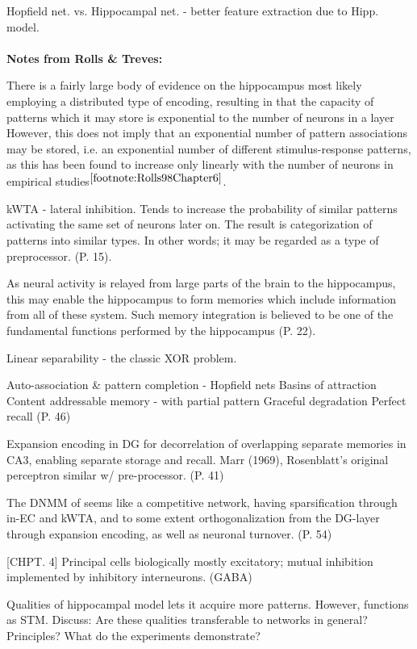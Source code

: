Hopfield net. vs. Hippocampal net. - better feature extraction due to Hipp. model.
\\\\

\textbf{Notes from Rolls \& Treves:}

There is a fairly large body of evidence on the hippocampus most likely employing a distributed type of encoding, resulting in that the capacity of patterns which it may store is exponential to the number of neurons in a layer
However, this does not imply that an exponential number of pattern associations may be stored, i.e. an exponential number of different stimulus-response patterns, as this has been found to increase only linearly with the number of neurons in empirical studies$^{\ref{footnote:Rolls98Chapter6}}$.

kWTA - lateral inhibition. Tends to increase the probability of similar patterns activating the same set of neurons later on. The result is categorization of patterns into similar types. In other words; it may be regarded as a type of preprocessor. (P. 15).

As neural activity is relayed from large parts of the brain to the hippocampus, this may enable the hippocampus to form memories which include information from all of these system. Such memory integration is believed to be one of the fundamental functions performed by the hippocampus (P. 22).

Linear separability - the classic XOR problem.

Auto-association \& pattern completion - Hopfield nets
Basins of attraction
Content addressable memory - with partial pattern
Graceful degradation
Perfect recall (P. 46)

Expansion encoding in DG for decorrelation of overlapping separate memories in CA3, enabling separate storage and recall. Marr (1969), Rosenblatt's original perceptron similar w/ pre-processor. (P. 41)

The DNMM of \cite{Hattori2014} seems like a competitive network, having sparsification through in-EC and kWTA, and to some extent orthogonalization from the DG-layer through expansion encoding, as well as neuronal turnover. (P. 54)

[CHPT. 4]
Principal cells biologically mostly excitatory; mutual inhibition implemented by inhibitory interneurons. (GABA)

Qualities of hippocampal model lets it acquire more patterns. However, functions as STM. Discuss: Are these qualities transferable to networks in general? Principles? What do the experiments demonstrate?

